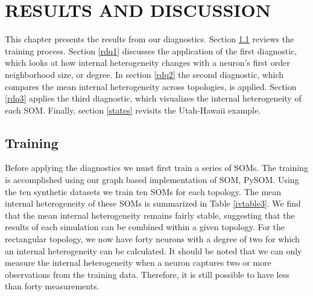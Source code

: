 \chapter{RESULTS AND DISCUSSION}
This chapter presents the results from our diagnostics.  Section \ref{rtrain}
reviews the training process.  Section \ref{rdq1} discusses the application of
the first diagnostic, which looks at how internal heterogeneity changes with a
neuron's first order neighborhood size, or degree.  In section \ref{rdq2} the
second diagnostic, which compares the mean internal heterogeneity across
topologies, is applied.  Section \ref{rdq3} applies the third
diagnostic, which visualizes the internal heterogeneity of each SOM. Finally,
section \ref{states} revisits the Utah-Hawaii example.

\section{Training}
\label{rtrain}
Before applying the diagnostics we must first train a series of SOMs.  The
training is accomplished using our graph based implementation of SOM, PySOM.
Using the ten synthetic datasets we train ten SOMs for each topology.  The
mean internal heterogeneity of these SOMs is summarized in Table
\ref{ivtable3}.  We find that the mean internal heterogeneity remains fairly
stable, suggesting that the results of each simulation can be combined within
a given topology.  For the rectangular topology, we now have forty neurons
with a degree of two for which an internal heterogeneity can be calculated. It
should be noted that we can only measure the internal heterogeneity when a
neuron captures two or more observations from the training data.  Therefore,
it is still possible to have less than forty measurements.

